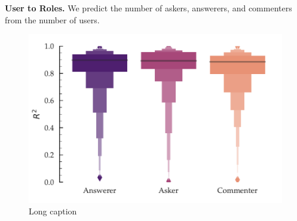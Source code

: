\begin{table}[h!]
\begin{tabular}{m{}c}
\begin{minipage}{.17\textwidth}
    \end{minipage}
    \\
    \bottomrule
  \end{tabular}
  \vspace{-\baselineskip}
\end{table}

\textbf{User to Roles.} 
We predict the number of askers, answerers, and commenters from the number of users. 

\begin{figure}[hbt]
\centering
\includegraphics[scale=0.45]{Figures/User_to_Roles_R_Squared_LV.pdf}
\caption{Long caption}
\end{figure}



